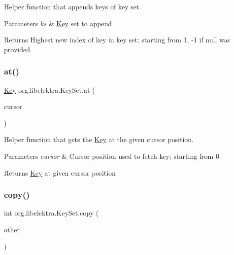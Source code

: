 Helper function that appends keys of key set. 


\begin{DoxyParams}{Parameters}
{\em ks} & \hyperlink{classorg_1_1libelektra_1_1Key}{Key} set to append \\
\hline
\end{DoxyParams}
\begin{DoxyReturn}{Returns}
Highest new index of key in key set; starting from 1, -\/1 if null was provided 
\end{DoxyReturn}
\mbox{\label{classorg_1_1libelektra_1_1KeySet_a125d86734bd428c9eb1f937eb1b7ab74}} 
\subsubsection{\texorpdfstring{at()}{at()}}
{\footnotesize\ttfamily \hyperlink{classorg_1_1libelektra_1_1Key}{Key} org.\+libelektra.\+Key\+Set.\+at (\begin{DoxyParamCaption}\item[{final int}]{cursor }\end{DoxyParamCaption})\hspace{0.3cm}{\ttfamily [inline]}}



Helper function that gets the \hyperlink{classorg_1_1libelektra_1_1Key}{Key} at the given cursor position. 


\begin{DoxyParams}{Parameters}
{\em cursor} & Cursor position used to fetch key; starting from 0 \\
\hline
\end{DoxyParams}
\begin{DoxyReturn}{Returns}
\hyperlink{classorg_1_1libelektra_1_1Key}{Key} at given cursor position 
\end{DoxyReturn}
\mbox{\label{classorg_1_1libelektra_1_1KeySet_a32cba0dbe638373296fb242a698ad1cb}} 
\subsubsection{\texorpdfstring{copy()}{copy()}}
{\footnotesize\ttfamily int org.\+libelektra.\+Key\+Set.\+copy (\begin{DoxyParamCaption}\item[{final \hyperlink{classorg_1_1libelektra_1_1KeySet}{Key\+Set}}]{other }\end{DoxyParamCaption})\hspace{0.3cm}{\ttfamily [inline]}}



